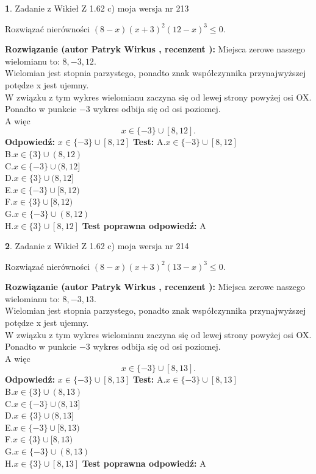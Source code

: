 \documentclass[12pt, a4paper]{article}
\theoremstyle{definition} %
\newtheorem{zad}{}
\newcommand{\zadStart}[1]{\begin{zad}#1\newline}
\newcommand{\zadStop}{\end{zad}}
\newcommand{\rozwStart}[2]{\noindent \textbf{Rozwiązanie (autor #1 , recenzent #2): }\newline}
\newcommand{\rozwStop}{\newline}
\newcommand{\odpStart}{\noindent \textbf{Odpowiedź:}\newline}
\newcommand{\odpStop}{\newline}
\newcommand{\testStart}{\noindent \textbf{Test:}\newline}
\newcommand{\testStop}{\newline}
\newcommand{\kluczStart}{\noindent \textbf{Test poprawna odpowiedź:}\newline}
\newcommand{\kluczStop}{\newline}
\begin{document}
\zadStart{Zadanie z Wikieł Z 1.62 c) moja wersja nr 213}

Rozwiązać nierówności $(8-x)(x+3)^{2}(12-x)^{3}\le0$.
\zadStop
\rozwStart{Patryk Wirkus}{}
Miejsca zerowe naszego wielomianu to: $8, -3, 12$.\\
Wielomian jest stopnia parzystego, ponadto znak współczynnika przy\linebreak najwyższej potędze x jest ujemny.\\ W związku z tym wykres wielomianu zaczyna się od lewej strony powyżej osi OX.\\
Ponadto w punkcie $-3$ wykres odbija się od osi poziomej.\\
A więc $$x \in \{-3\} \cup [8,12].$$
\rozwStop
\odpStart
$x \in \{-3\} \cup [8,12]$
\odpStop
\testStart
A.$x \in \{-3\} \cup [8,12]$\\
B.$x \in \{3\} \cup (8,12)$\\
C.$x \in \{-3\} \cup (8,12]$\\
D.$x \in \{3\} \cup (8,12]$\\
E.$x \in \{-3\} \cup [8,12)$\\
F.$x \in \{3\} \cup [8,12)$\\
G.$x \in \{-3\} \cup (8,12)$\\
H.$x \in \{3\} \cup [8,12]$
\testStop
\kluczStart
A
\kluczStop



\zadStart{Zadanie z Wikieł Z 1.62 c) moja wersja nr 214}

Rozwiązać nierówności $(8-x)(x+3)^{2}(13-x)^{3}\le0$.
\zadStop
\rozwStart{Patryk Wirkus}{}
Miejsca zerowe naszego wielomianu to: $8, -3, 13$.\\
Wielomian jest stopnia parzystego, ponadto znak współczynnika przy\linebreak najwyższej potędze x jest ujemny.\\ W związku z tym wykres wielomianu zaczyna się od lewej strony powyżej osi OX.\\
Ponadto w punkcie $-3$ wykres odbija się od osi poziomej.\\
A więc $$x \in \{-3\} \cup [8,13].$$
\rozwStop
\odpStart
$x \in \{-3\} \cup [8,13]$
\odpStop
\testStart
A.$x \in \{-3\} \cup [8,13]$\\
B.$x \in \{3\} \cup (8,13)$\\
C.$x \in \{-3\} \cup (8,13]$\\
D.$x \in \{3\} \cup (8,13]$\\
E.$x \in \{-3\} \cup [8,13)$\\
F.$x \in \{3\} \cup [8,13)$\\
G.$x \in \{-3\} \cup (8,13)$\\
H.$x \in \{3\} \cup [8,13]$
\testStop
\kluczStart
A
\kluczStop
\end{document}
